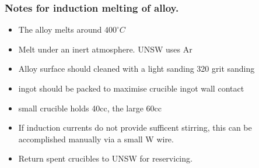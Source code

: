 \subsubsection{Notes for induction melting of \MgZnCa alloy.}
\begin{itemize}
\item The \MgZnCa alloy melts around $400^{\circ}C$
\item Melt under an inert atmosphere. UNSW uses Ar
\item Alloy surface should cleaned with a light sanding 320 grit sanding
\item ingot should be packed to maximise crucible ingot wall contact
\item small crucible holds 40cc, the large 60cc
\item If induction currents do not provide sufficent stirring, this can be accomplished manually via a small W wire. 
\item Return spent crucibles to UNSW for reservicing. 
\end{itemize}